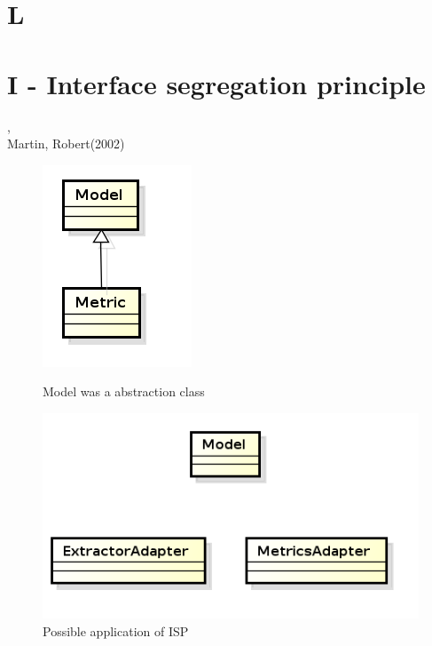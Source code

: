 
\section{L} %
\label{sec:l}


\section{I - Interface segregation principle} %
\label{sec:i}
\begin{frame}
	,\\Martin, Robert(2002)
\end{frame}
\begin{frame}
\begin{figure}
        \centering
        \begin{minipage}{.5\textwidth}
            \centering
            \includegraphics[width=.4\linewidth]{ipossivelerro2.png}
            \caption{Model was a abstraction class}
        \end{minipage}%
        \begin{minipage}{.5\textwidth}
            \centering
            \includegraphics[width=.4\linewidth]{improvement2.png}
            \caption{Possible application of ISP}
        \end{minipage}
    \end{figure}
\end{frame}

